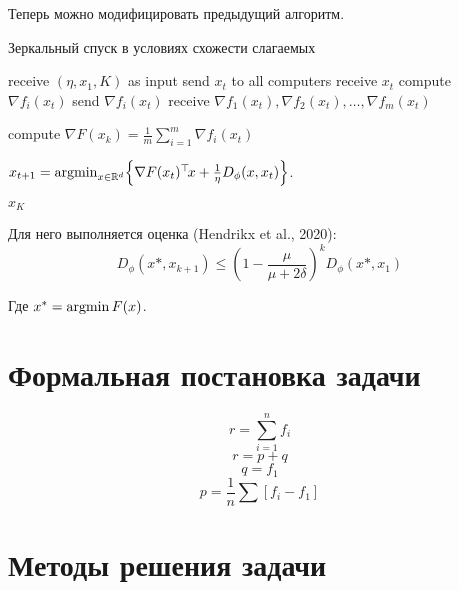 \documentclass[a4paper,12pt]{extarticle}
\newcommand{\argmin}{\mathop{\rm argmin}}
\begin{document}
Теперь можно модифицировать предыдущий алгоритм.

\begin{algorithm}[]
\caption{Зеркальный спуск в условиях схожести слагаемых}
\begin{algorithmic}[1]

\STATE{} receive $(\eta, x_1, K)$ as input 
\vspace{0.5ex}
\vspace{0.5ex}
\STATE{} send $x_t$ to all computers 
\vspace{0.5ex}
\vspace{0.5ex}
\vspace{0.5ex}
\STATE{} receive $x_t$
\vspace{0.5ex}
\STATE{} compute $\nabla f_i(x_t)$
\vspace{0.5ex}
\STATE{} send $\nabla f_i(x_t)$
\vspace{0.5ex}
\ENDFOR{}
\vspace{0.5ex}
\STATE{} receive $\nabla f_1(x_t), \nabla f_2(x_t), \ldots, \nabla f_m(x_t)$
\vspace{0.5ex}

\STATE{} compute $\nabla F(x_k)= \frac{1}{m} \sum_{i = 1}^{m}  \nabla f_i(x_t)$\
\vspace{0.5ex}

\STATE{} $x_{t+1} = \argmin_{x\in \R^d} \Bigl\{\nabla F(x_t){}^\top\! x + \frac{1}{\eta} D_\phi(x,x_{t}) \Bigr\}$.
\vspace{0.5ex}

\ENDFOR{}
\RETURN{} $x_{K}$
\end{algorithmic}
\end{algorithm}



Для него выполняется оценка (Hendrikx et al., 2020)\cite{Hendrikx-paper}:
\begin{equation} \label{eqn:mirror_convergence}
    D_\phi(x*, x_{k+1}) \leq \left (1 - \frac{\mu}{\mu + 2\delta} \right ) ^k D_\phi(x*, x_1)
\end{equation}

Где $x^* = \argmin F(x)$.


\section{Формальная постановка задачи}
    \[ r = \sum_{i=1}^n f_i \]
    \[ r = p + q \]
    \[q = f_1 \] 
    \[p = \frac1n \sum \left[ f_i - f_1\right] \]
\section{Методы решения задачи}
\end{document}
